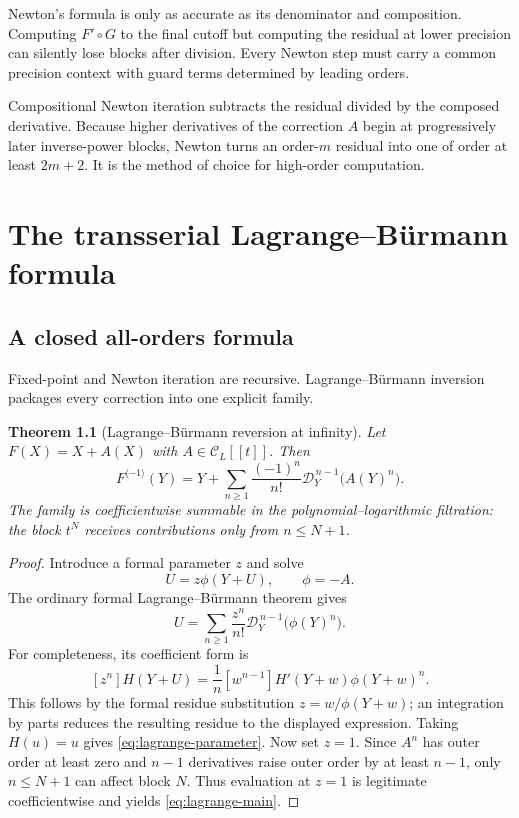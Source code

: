 \documentclass[11pt,oneside]{book}
\newtheorem{theorem}{Theorem}[chapter]
\theoremstyle{definition}
\theoremstyle{remark}
\newcommand{\D}{\mathcal D}
\newcommand{\compinv}{^{\langle-1\rangle}}
\newcommand{\compose}{\mathbin{\circ}}
\begin{document}
\begin{pitfallbox}
Newton's formula is only as accurate as its denominator and composition.
Computing $F'\compose G$ to the final cutoff but computing the residual at
lower precision can silently lose blocks after division.  Every Newton step
must carry a common precision context with guard terms determined by leading
orders.
\end{pitfallbox}

\begin{summarybox}
Compositional Newton iteration subtracts the residual divided by the composed
derivative.  Because higher derivatives of the correction $A$ begin at
progressively later inverse-power blocks, Newton turns an order-$m$ residual
into one of order at least $2m+2$.  It is the method of choice for high-order
computation.
\end{summarybox}


\chapter{The transserial Lagrange--B\"urmann formula}
\label{ch:reversion-lagrange}

\section{A closed all-orders formula}
Fixed-point and Newton iteration are recursive.  Lagrange--B\"urmann inversion
packages every correction into one explicit family.

\begin{theorem}[Lagrange--B\"urmann reversion at infinity]
\label{thm:lagrange-transserial}
Let $F(X)=X+A(X)$ with $A\in\mathcal C_L[[t]]$.  Then
\begin{equation}\label{eq:lagrange-main}
 F\compinv(Y)
 =Y+\sum_{n\ge1}\frac{(-1)^n}{n!}
 \D_Y^{\,n-1}\bigl(A(Y)^n\bigr).
\end{equation}
The family is coefficientwise summable in the polynomial--logarithmic
filtration: the block $t^N$ receives contributions only from $n\le N+1$.
\end{theorem}

\begin{proof}
Introduce a formal parameter $z$ and solve
\[
 U=z\phi(Y+U),
 \qquad \phi=-A.
\]
The ordinary formal Lagrange--B\"urmann theorem gives
\begin{equation}\label{eq:lagrange-parameter}
 U=\sum_{n\ge1}\frac{z^n}{n!}
 \D_Y^{\,n-1}\bigl(\phi(Y)^n\bigr).
\end{equation}
For completeness, its coefficient form is
\[
 [z^n]H(Y+U)
 =\frac1n[w^{n-1}]H'(Y+w)\phi(Y+w)^n.
\]
This follows by the formal residue substitution
$z=w/\phi(Y+w)$; an integration by parts reduces the resulting residue to the
displayed expression.  Taking $H(u)=u$ gives
\eqref{eq:lagrange-parameter}.  Now set $z=1$.  Since $A^n$ has outer order at
least zero and $n-1$ derivatives raise outer order by at least $n-1$, only
$n\le N+1$ can affect block $N$.  Thus evaluation at $z=1$ is legitimate
coefficientwise and yields \eqref{eq:lagrange-main}.
\end{proof}
\end{document}
